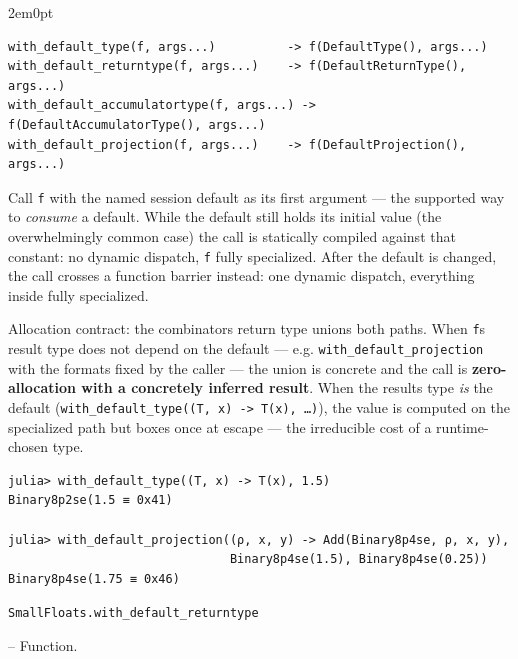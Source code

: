 \begin{adjustwidth}{2em}{0pt}


\begin{verbatim}
with_default_type(f, args...)          -> f(DefaultType(), args...)
with_default_returntype(f, args...)    -> f(DefaultReturnType(), args...)
with_default_accumulatortype(f, args...) -> f(DefaultAccumulatorType(), args...)
with_default_projection(f, args...)    -> f(DefaultProjection(), args...)
\end{verbatim}

Call \texttt{f} with the named session default as its first argument — the supported way to \emph{consume} a default. While the default still holds its initial value (the overwhelmingly common case) the call is statically compiled against that constant: no dynamic dispatch, \texttt{f} fully specialized. After the default is changed, the call crosses a function barrier instead: one dynamic dispatch, everything inside fully specialized.

Allocation contract: the combinator{\textquotesingle}s return type unions both paths. When \texttt{f}{\textquotesingle}s result type does not depend on the default — e.g. \texttt{with\_default\_projection} with the formats fixed by the caller — the union is concrete and the call is \textbf{zero-allocation with a concretely inferred result}. When the result{\textquotesingle}s type \emph{is} the default (\texttt{with\_default\_type((T, x) -> T(x), …)}), the value is computed on the specialized path but boxes once at escape — the irreducible cost of a runtime-chosen type.


\begin{verbatim}
julia> with_default_type((T, x) -> T(x), 1.5)
Binary8p2se(1.5 ≡ 0x41)

julia> with_default_projection((ρ, x, y) -> Add(Binary8p4se, ρ, x, y),
                               Binary8p4se(1.5), Binary8p4se(0.25))
Binary8p4se(1.75 ≡ 0x46)
\end{verbatim}



\end{adjustwidth}
\hypertarget{5780687441881078027}{\texttt{SmallFloats.with\_default\_returntype}}  -- {Function.}


